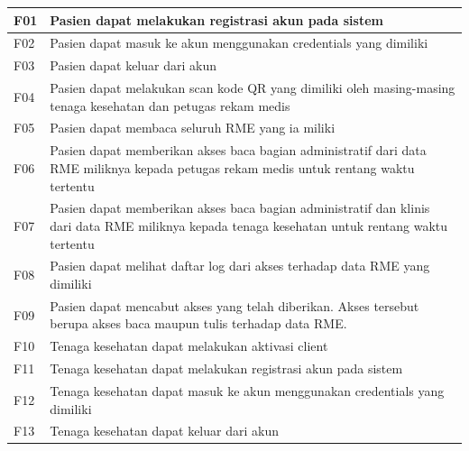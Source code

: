 \begin{longtable}{|p{0.8cm}|p{11.5cm}|}
	F01         & Pasien dapat melakukan registrasi akun pada sistem                                                                                             \\ \hline
	F02         & Pasien dapat masuk ke akun menggunakan credentials yang dimiliki                                                                               \\ \hline
	F03         & Pasien dapat keluar dari akun                                                                                                                  \\ \hline
	F04         & Pasien dapat melakukan scan kode QR yang dimiliki oleh masing-masing tenaga kesehatan dan petugas rekam medis                                  \\ \hline
	F05         & Pasien dapat membaca seluruh RME yang ia miliki                                                                                                \\ \hline
	F06         & Pasien dapat memberikan akses baca bagian administratif dari data RME miliknya kepada petugas rekam medis untuk rentang waktu tertentu         \\ \hline
	F07         & Pasien dapat memberikan akses baca bagian administratif dan klinis dari data RME miliknya kepada tenaga kesehatan untuk rentang waktu tertentu \\ \hline
	F08         & Pasien dapat melihat daftar log dari akses terhadap data RME yang dimiliki                                                                     \\ \hline
	F09         & Pasien dapat mencabut akses yang telah diberikan. Akses tersebut berupa akses baca maupun tulis terhadap data RME.                             \\ \hline
	F10         & Tenaga kesehatan dapat melakukan aktivasi client                                                                                               \\ \hline
	F11         & Tenaga kesehatan dapat melakukan registrasi akun pada sistem                                                                                   \\ \hline
	F12         & Tenaga kesehatan dapat masuk ke akun menggunakan credentials yang dimiliki                                                                     \\ \hline
	F13         & Tenaga kesehatan dapat keluar dari akun                                                                                                        \\ \hline

\end{longtable}
